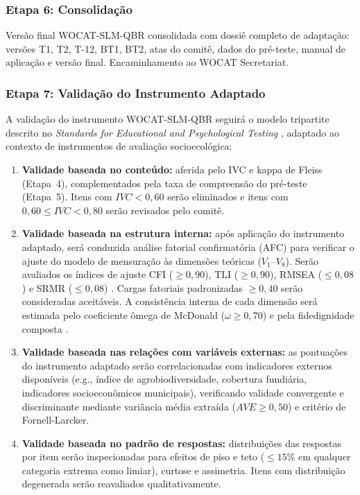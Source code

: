 \subsubsection{Etapa 6: Consolidação}

Versão final WOCAT-SLM-QBR consolidada com dossiê completo de adaptação: versões T1, T2, T-12, BT1, BT2, atas do comitê, dados do pré-teste, manual de aplicação e versão final. Encaminhamento ao WOCAT Secretariat.

\subsubsection{Etapa 7: Validação do Instrumento Adaptado}

A validação do instrumento WOCAT-SLM-QBR seguirá o modelo tripartite descrito no \textit{Standards for Educational and Psychological Testing} \cite{Association2018}, adaptado ao contexto de instrumentos de avaliação socioecológica:

\begin{enumerate}[label=(\roman*)]
\item \textbf{Validade baseada no conteúdo:} aferida pelo IVC e kappa de Fleiss (Etapa~4), complementados pela taxa de compreensão do pré-teste (Etapa~5). Itens com $IVC < 0{,}60$ serão eliminados e itens com $0{,}60 \leq IVC < 0{,}80$ serão revisados pelo comitê.

\item \textbf{Validade baseada na estrutura interna:} após aplicação do instrumento adaptado, será conduzida análise fatorial confirmatória (AFC) para verificar o ajuste do modelo de mensuração às dimensões teóricas ($V_1$--$V_8$). Serão avaliados os índices de ajuste CFI ($\geq 0{,}90$), TLI ($\geq 0{,}90$), RMSEA ($\leq 0{,}08$) e SRMR ($\leq 0{,}08$) \cite{Brown2015,Kline2016PrinciplesLivros}. Cargas fatoriais padronizadas $\geq 0{,}40$ serão consideradas aceitáveis. A consistência interna de cada dimensão será estimada pelo coeficiente ômega de McDonald ($\omega \geq 0{,}70$) e pela fidedignidade composta \cite{Raykov2016EstimationMeasures}.

\item \textbf{Validade baseada nas relações com variáveis externas:} as pontuações do instrumento adaptado serão correlacionadas com indicadores externos disponíveis (e.g., índice de agrobiodiversidade, cobertura fundiária, indicadores socioeconômicos municipais), verificando validade convergente e discriminante mediante variância média extraída ($AVE \geq 0{,}50$) e critério de Fornell-Larcker.

\item \textbf{Validade baseada no padrão de respostas:} distribuições das respostas por item serão inspecionadas para efeitos de piso e teto ($\leq 15\%$ em qualquer categoria extrema como limiar), curtose e assimetria. Itens com distribuição degenerada serão reavaliados qualitativamente.
\end{enumerate}

